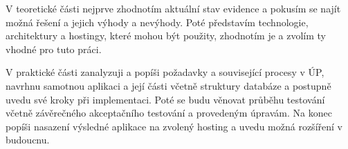 V teoretické části nejprve zhodnotím aktuální stav evidence a pokusím se najít možná řešení a jejich výhody a nevýhody. Poté představím technologie, architektury a hostingy, které mohou být použity, zhodnotím je a zvolím ty vhodné pro tuto práci.

V praktické části zanalyzuji a popíši požadavky a související procesy v ÚP, navrhnu samotnou aplikaci a její části včetně struktury databáze a postupně uvedu své kroky při implementaci. Poté se budu věnovat průběhu testování včetně závěrečného akceptačního testování a provedeným úpravám. Na konec popíši nasazení výsledné aplikace na zvolený hosting a uvedu možná rozšíření v budoucnu.